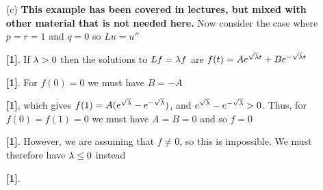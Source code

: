 \documentclass[a4paper]{article}
\newcounter{probcounter}
\newcounter{marksawarded}
\newcommand{\mks}[1]{%
\addtocounter{marksawarded}{#1}%
\textbf{\color{red}[#1]}}
\newcommand{\mk}{\mks{1}}
\newenvironment{solution}{\comment}{\endcomment}
\newenvironment{solution}{
{\bigskip\par\noindent \bf Solution:}}{
\newpage
\typeout{Q\arabic{probcounter}: \arabic{marksawarded} marks awarded}
}
\begin{document}
\begin{solution}
\begin{itemize}
\begin{itemize}
     \[ \ip{g,g}+\ip{h,h} = \int_0^1 r.(g^2+h^2) = \int_0^1r.|f|^2. \]
     We are given that $f\neq 0$ and $r(x)>0$ for all $x$, so
     $\ip{g,g}+\ip{h,h}>0$, so we can conclude that $\nu=0$ \mk.  This
     means that $\lm$ is real \mk.
    \item[(c)] \textbf{This example has been covered in lectures, but
      mixed with other material that is not needed here.}
     Now consider the case where $p=r=1$ and $q=0$ so
     $Lu=u''$ \mk.  If $\lambda>0$ then the solutions to $Lf=\lambda f$ are
     $f(t)=Ae^{\sqrt{\lambda}t}+Be^{-\sqrt{\lambda}t}$ \mk.  For $f(0)=0$ we must
     have $B=-A$ \mk, which gives
     $f(1)=A(e^{\sqrt{\lambda}}-e^{-\sqrt{\lambda}})$, and
     $e^{\sqrt{\lambda}}-e^{-\sqrt{\lambda}}>0$.  Thus, for $f(0)=f(1)=0$ we
     must have $A=B=0$ and so $f=0$ \mk.  However, we are assuming that
     $f\neq 0$, so this is impossible.  We must therefore have
     $\lambda\leq 0$ instead \mk.
   \end{itemize}
 \end{itemize}
\end{solution}
\end{document}
